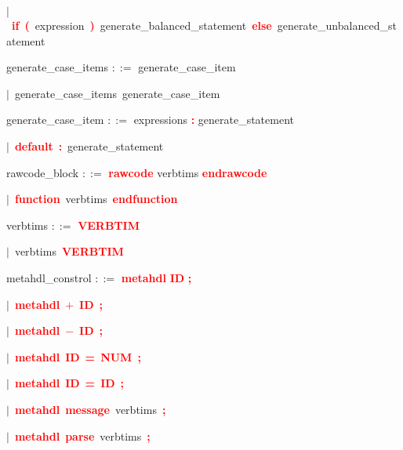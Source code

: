 \mbox{$|$ \textbf{\textcolor{red}{if}} \textbf{\textcolor{red}{(}} expression \textbf{\textcolor{red}{)}} generate\_balanced\_statement \textbf{\textcolor{red}{else}} generate\_unbalanced\_statement}

\vspace{1em}
\noindent
\settowidth{\parindent}{\hspace{4ex}}
generate\_case\_items $::=$\hspace{1ex} generate\_case\_item

\mbox{$|$ generate\_case\_items generate\_case\_item}

\vspace{1em}
\noindent
\settowidth{\parindent}{\hspace{4ex}}
generate\_case\_item $::=$\hspace{1ex} expressions \textbf{\textcolor{red}{:}} generate\_statement

\mbox{$|$ \textbf{\textcolor{red}{default}} \textbf{\textcolor{red}{:}} generate\_statement}

\vspace{1em}
\noindent
\settowidth{\parindent}{\hspace{4ex}}
rawcode\_block $::=$\hspace{1ex} \textbf{\textcolor{red}{rawcode}} verbtims \textbf{\textcolor{red}{endrawcode}}

\mbox{$|$ \textbf{\textcolor{red}{function}} verbtims \textbf{\textcolor{red}{endfunction}}}

\vspace{1em}
\noindent
\settowidth{\parindent}{\hspace{4ex}}
verbtims $::=$\hspace{1ex} \textbf{\textcolor{red}{VERBTIM}}

\mbox{$|$ verbtims \textbf{\textcolor{red}{VERBTIM}}}

\vspace{1em}
\noindent
\settowidth{\parindent}{\hspace{4ex}}
metahdl\_constrol $::=$\hspace{1ex} \textbf{\textcolor{red}{metahdl}} \textbf{\textcolor{red}{ID}} \textbf{\textcolor{red}{;}}

\mbox{$|$ \textbf{\textcolor{red}{metahdl}} \textbf{\textcolor{red}{$+$}} \textbf{\textcolor{red}{ID}} \textbf{\textcolor{red}{;}}}

\mbox{$|$ \textbf{\textcolor{red}{metahdl}} \textbf{\textcolor{red}{$-$}} \textbf{\textcolor{red}{ID}} \textbf{\textcolor{red}{;}}}

\mbox{$|$ \textbf{\textcolor{red}{metahdl}} \textbf{\textcolor{red}{ID}} \textbf{\textcolor{red}{=}} \textbf{\textcolor{red}{NUM}} \textbf{\textcolor{red}{;}}}

\mbox{$|$ \textbf{\textcolor{red}{metahdl}} \textbf{\textcolor{red}{ID}} \textbf{\textcolor{red}{=}} \textbf{\textcolor{red}{ID}} \textbf{\textcolor{red}{;}}}

\mbox{$|$ \textbf{\textcolor{red}{metahdl}} \textbf{\textcolor{red}{message}} verbtims \textbf{\textcolor{red}{;}}}

\mbox{$|$ \textbf{\textcolor{red}{metahdl}} \textbf{\textcolor{red}{parse}} verbtims \textbf{\textcolor{red}{;}}}
